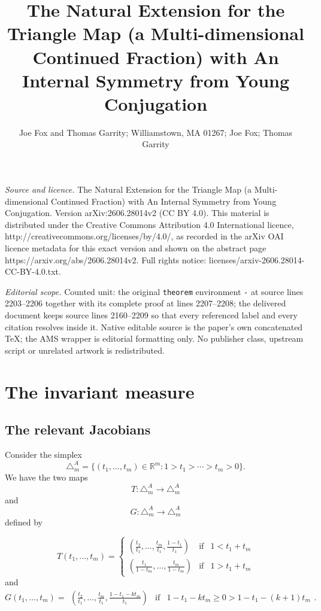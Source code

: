\documentclass[10pt,a4paper]{amsart}
\def\R{{\mathbb R}} %
\begin{document}
\title[The Natural Extension for the Triangle Map (a Multi-dimensio]{The Natural Extension for the Triangle Map (a Multi-dimensional Continued Fraction) with An Internal Symmetry from Young Conjugation}
\author{Joe Fox and Thomas Garrity; Williamstown, MA 01267; Joe Fox; Thomas Garrity}
\date{}
\maketitle
\noindent\emph{Source and licence.} The Natural Extension for the Triangle Map (a Multi-dimensional Continued Fraction) with An Internal Symmetry from Young Conjugation. Version arXiv:2606.28014v2 (CC BY 4.0). This material is distributed under the Creative Commons Attribution 4.0 International licence, http://creativecommons.org/licenses/by/4.0/, as recorded in the arXiv OAI licence metadata for this exact version and shown on the abstract page https://arxiv.org/abs/2606.28014v2. Full rights notice: licenses/arxiv-2606.28014-CC-BY-4.0.txt.\par\smallskip
\noindent\textit{Editorial scope.} Counted unit: the original \texttt{theorem} environment \texttt{-} at source lines 2203--2206 together with its complete proof at lines 2207--2208; the delivered document keeps source lines 2160--2209 so that every referenced label and every citation resolves inside it. Native editable source is the paper's own concatenated TeX; the AMS wrapper is editorial formatting only. No publisher class, upstream script or unrelated artwork is redistributed.
\section{The invariant measure} \label{The invariant measure} 

\subsection{The relevant Jacobians}
 Consider
the simplex 
$$\triangle_m^A= \{ (t_1, \ldots , t_m) \in \R^m:  1>t_1 > \cdots > t_m >0\}.$$
We have the two maps
$$T:\triangle_m^A \rightarrow \triangle_m^A$$
and
$$G:\triangle_m^A \rightarrow \triangle_m^A$$
defined by 

$$T(t_1, \ldots, t_m) = \left\{  \begin{array}{ccc} \left( \frac{t_2}{t_1} , \ldots, \frac{t_m}{t_1}, \frac{1-t_1}{t_1} \right)& \mbox{if}& 1< t_1 + t_m  \\
 \left( \frac{t_1}{ 1 - t_m} , \ldots, \frac{t_m}{1- t_m} \right)& \mbox{if}& 1> t_1 + t_m \end{array} \right.$$
 and 
 $$G(t_1, \ldots, t_m) =   \begin{array}{ccc} \left( \frac{t_2}{t_1} , \ldots, \frac{t_m}{t_1}, \frac{1-t_1 - k t_m}{t_1} \right)& \mbox{if}& 1-t_1-kt_m \geq 0 >1-t_1-(k+1)t_m   \end{array} .$$
 
\end{document}
